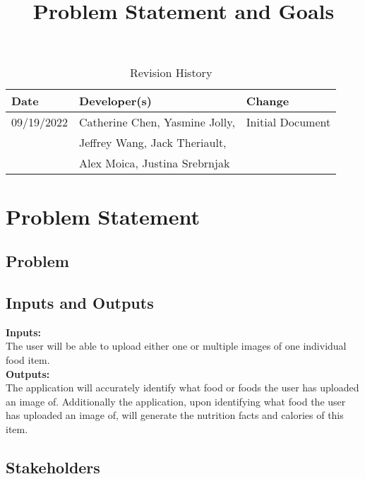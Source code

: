 \documentclass{article}
\title{Problem Statement and Goals\\\progname}
\author{\authname}
\date{}
\begin{document}
\maketitle

\begin{table}[hp]
\caption{Revision History} \label{TblRevisionHistory}
\begin{tabularx}{\textwidth}{llX}
\toprule
\textbf{Date} & \textbf{Developer(s)} & \textbf{Change}\\
\midrule
09/19/2022 & Catherine Chen, Yasmine Jolly, &Initial Document\\ 
&Jeffrey Wang, Jack Theriault, &\\
&Alex Moica, Justina Srebrnjak &\\
\bottomrule
\end{tabularx}
\end{table}

\section{Problem Statement}


\subsection{Problem}

\subsection{Inputs and Outputs}
\textbf{Inputs:}\\
The user will be able to upload either one or multiple images of one individual 
food item.\\
\textbf{Outputs:}\\
The application will accurately identify what food or foods the user has 
uploaded an image of. Additionally the application, upon identifying what food 
the user has uploaded an image of, will generate the nutrition facts and 
calories of this item.

\subsection{Stakeholders}
\end{document}
